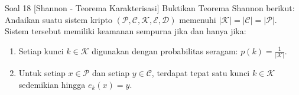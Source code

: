 \documentclass[11pt,a4paper]{article}
\begin{document}
\begin{soalklasik}{Soal 18 [Shannon - Teorema Karakterisasi]}
Buktikan Teorema Shannon berikut:
Andaikan suatu sistem kripto $(\mathcal{P}, \mathcal{C}, \mathcal{K}, \mathcal{E}, \mathcal{D})$ memenuhi $|\mathcal{K}| = |\mathcal{C}| = |\mathcal{P}|$.
Sistem tersebut memiliki keamanan sempurna jika dan hanya jika:
\begin{enumerate}[label=(\arabic*)]
    \item Setiap kunci $k \in \mathcal{K}$ digunakan dengan probabilitas seragam: $p(k) = \frac{1}{|\mathcal{K}|}$.
    \item Untuk setiap $x \in \mathcal{P}$ dan setiap $y \in \mathcal{C}$, terdapat tepat satu kunci $k \in \mathcal{K}$ sedemikian hingga $e_k(x) = y$.
\end{enumerate}
\end{soalklasik}
\end{document}
